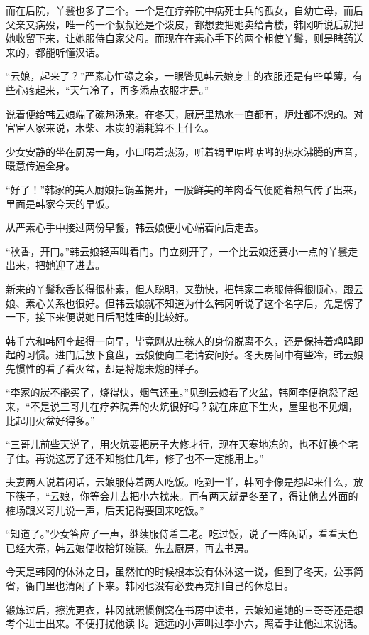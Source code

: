 而在后院，丫鬟也多了三个。一个是在疗养院中病死士兵的孤女，自幼亡母，而后父亲又病殁，唯一的一个叔叔还是个泼皮，都想要把她卖给青楼，韩冈听说后就把她收留下来，让她服侍自家父母。而现在在素心手下的两个粗使丫鬟，则是瞎药送来的，都能听懂汉话。

“云娘，起来了？”严素心忙碌之余，一眼瞥见韩云娘身上的衣服还是有些单薄，有些心疼起来，“天气冷了，再多添点衣服才是。”

说着便给韩云娘端了碗热汤来。在冬天，厨房里热水一直都有，炉灶都不熄的。对官宦人家来说，木柴、木炭的消耗算不上什么。

少女安静的坐在厨房一角，小口喝着热汤，听着锅里咕嘟咕嘟的热水沸腾的声音，暖意传遍全身。

“好了！”韩家的美人厨娘把锅盖揭开，一股鲜美的羊肉香气便随着热气传了出来，里面是韩家今天的早饭。

从严素心手中接过两份早餐，韩云娘便小心端着向后走去。

“秋香，开门。”韩云娘轻声叫着门。门立刻开了，一个比云娘还要小一点的丫鬟走出来，把她迎了进去。

新来的丫鬟秋香长得很朴素，但人聪明，又勤快，把韩家二老服侍得很顺心，跟云娘、素心关系也很好。但韩云娘就不知道为什么韩冈听说了这个名字后，先是愣了一下，接下来便说她日后配姓唐的比较好。

韩千六和韩阿李起得一向早，毕竟刚从庄稼人的身份脱离不久，还是保持着鸡鸣即起的习惯。进门后放下食盘，云娘便向二老请安问好。冬天房间中有些冷，韩云娘先惯性的看了看火盆，却是将熄未熄的样子。

“李家的炭不能买了，烧得快，烟气还重。”见到云娘看了火盆，韩阿李便抱怨了起来，“不是说三哥儿在疗养院弄的火炕很好吗？就在床底下生火，屋里也不见烟，比起用火盆好得多。”

“三哥儿前些天说了，用火炕要把房子大修才行，现在天寒地冻的，也不好换个宅子住。再说这房子还不知能住几年，修了也不一定能用上。”

夫妻两人说着闲话，云娘服侍着两人吃饭。吃到一半，韩阿李像是想起来什么，放下筷子，“云娘，你等会儿去把小六找来。再有两天就是冬至了，得让他去外面的榷场跟义哥儿说一声，后天记得要回来吃饭。”

“知道了。”少女答应了一声，继续服侍着二老。吃过饭，说了一阵闲话，看看天色已经大亮，韩云娘便收拾好碗筷。先去厨房，再去书房。

今天是韩冈的休沐之日，虽然忙的时候根本没有休沐这一说，但到了冬天，公事简省，衙门里也清闲了下来。韩冈也没有必要再克扣自己的休息日。

锻炼过后，擦洗更衣，韩冈就照惯例窝在书房中读书，云娘知道她的三哥哥还是想考个进士出来。不便打扰他读书。远远的小声叫过李小六，照着手让他过来说话。

